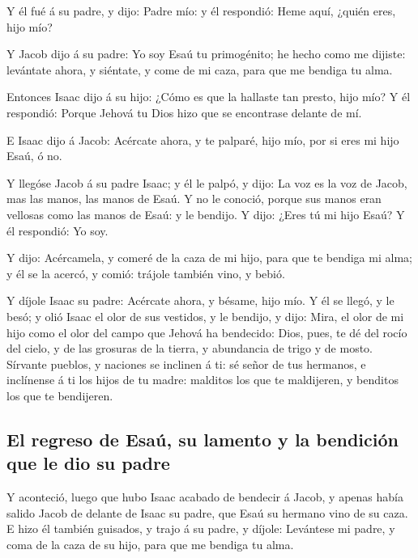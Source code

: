  Y él fué á su padre, y dijo: Padre mío: y él respondió:
Heme aquí, ¿quién eres, hijo mío?

 Y Jacob dijo á su padre: Yo soy Esaú tu primogénito; he
hecho como me dijiste: levántate ahora, y siéntate, y come de mi caza,
para que me bendiga tu alma.

 Entonces Isaac dijo á su hijo: ¿Cómo es que la hallaste
tan presto, hijo mío? Y él respondió: Porque Jehová tu Dios hizo que se
encontrase delante de mí.

 E Isaac dijo á Jacob: Acércate ahora, y te palparé, hijo
mío, por si eres mi hijo Esaú, ó no.

 Y llegóse Jacob á su padre Isaac; y él le palpó, y dijo:
La voz es la voz de Jacob, mas las manos, las manos de Esaú.
 Y no le conoció, porque sus manos eran vellosas como las
manos de Esaú: y le bendijo.  Y dijo: ¿Eres tú mi hijo
Esaú? Y él respondió: Yo soy.

 Y dijo: Acércamela, y comeré de la caza de mi hijo, para
que te bendiga mi alma; y él se la acercó, y comió: trájole también
vino, y bebió.

 Y díjole Isaac su padre: Acércate ahora, y bésame, hijo
mío.  Y él se llegó, y le besó; y olió Isaac el olor de sus
vestidos, y le bendijo, y dijo: Mira, el olor de mi hijo como el olor
del campo que Jehová ha bendecido:  Dios, pues, te dé del
rocío del cielo, y de las grosuras de la tierra, y abundancia de trigo y
de mosto.  Sírvante pueblos, y naciones se inclinen á ti:
sé señor de tus hermanos, e inclínense á ti los hijos de tu madre:
malditos los que te maldijeren, y benditos los que te bendijeren.

\hypertarget{el-regreso-de-esauxfa-su-lamento-y-la-bendiciuxf3n-que-le-dio-su-padre}{%
\subsection{El regreso de Esaú, su lamento y la bendición que le dio su
padre}\label{el-regreso-de-esauxfa-su-lamento-y-la-bendiciuxf3n-que-le-dio-su-padre}}

 Y aconteció, luego que hubo Isaac acabado de bendecir á
Jacob, y apenas había salido Jacob de delante de Isaac su padre, que
Esaú su hermano vino de su caza.  E hizo él también
guisados, y trajo á su padre, y díjole: Levántese mi padre, y coma de la
caza de su hijo, para que me bendiga tu alma.

